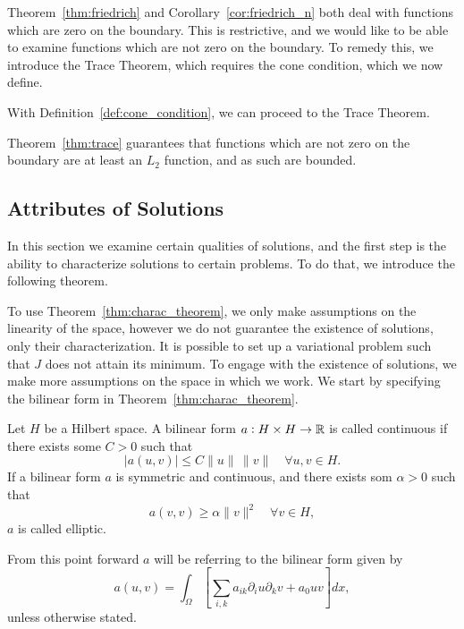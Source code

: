 
Theorem~\ref{thm:friedrich} and Corollary~\ref{cor:friedrich_n} both deal with 
functions which are zero on the boundary. 
This is restrictive, and we would like to be able to examine 
functions which are not zero on the boundary.
To remedy this, we introduce the Trace Theorem, which requires the cone condition, which we now define.

With Definition~\ref{def:cone_condition}, we can proceed to the Trace Theorem.

Theorem~\ref{thm:trace} guarantees that functions which are not 
zero on the boundary are at least an $L_2$ function, and as such are bounded. 
\subsection{Attributes of Solutions}
In this section we examine certain qualities of solutions, and the first step is 
the ability to characterize solutions to certain problems.
To do that, we introduce the following theorem.

To use Theorem~\ref{thm:charac_theorem}, we
only make assumptions on the linearity of the space, however we
do not guarantee the existence  of solutions, only their characterization.
It is possible to set up a variational problem such that $J$ does 
not attain its minimum.
To engage with the existence of solutions, we make more assumptions on 
the space in which we work.
We start by specifying the bilinear form in Theorem~\ref{thm:charac_theorem}.
\begin{defn}{\quad}
   Let $H$ be a Hilbert space. A bilinear form $a : H \times H \to \mathbb{R}$ is 
   called continuous if there exists some $C > 0$ such that 
   \begin{equation}
    |a(u,v)| \leq C \|u\|\, \|v\| \quad \forall u,v \in H.
   \end{equation} 
   If a bilinear form $a$ is symmetric and continuous, and there exists som $\alpha >0$ such that 
   \begin{equation*}
    a(v,v) \geq \alpha \|v\|^2 \quad \forall v \in H,
   \end{equation*}
   $a$ is called elliptic.\label{def:elliptic}
 \end{defn}
From this point forward $a$ will be referring to the bilinear form given by
\begin{equation}
   a(u,v) = \int_\Omega \left[\sum_{i,k} a_{ik}\partial_i u\partial_k v+a_0uv\right]dx,
\end{equation}
unless otherwise stated.

